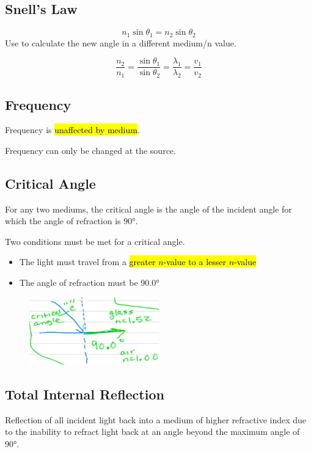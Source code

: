 \documentclass[a4paper,12pt]{article}
\begin{document}
\subsection{Snell's Law}
\Large $$n_1\sin{\theta_1} = n_2\sin{\theta_2}$$ \normalsize
Use to calculate the new angle in a different medium/n value.

\Large $$\frac{n_2}{n_1} = \frac{\sin{\theta_1}}{\sin{\theta_2}} = \frac{\lambda_1}{\lambda_2} = \frac{v_1}{v_2}$$ \normalsize

\subsection{Frequency}
Frequency is \hl{unaffected by medium}. 

Frequency can only be changed at the source.

\subsection{Critical Angle}
For any two mediums, the critical angle is the angle of the incident angle for which the angle of refraction is \ang{90}.

Two conditions must be met for a critical angle.
\begin{itemize}
    \item{The light must travel from a \hl{greater $n$-value to a lesser $n$-value}}
    \item{The angle of refraction must be \ang{90.0}}
\end{itemize}
\begin{figure}[H]
    \centering
    \includegraphics[width=0.50\textwidth]{criticalangle}
\end{figure}

\subsection{Total Internal Reflection}
Reflection of all incident light back into a medium of higher refractive index due to the inability to refract light back at an angle beyond the maximum angle of \ang{90}.
\end{document}

